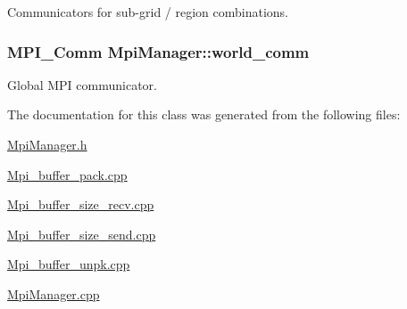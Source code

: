 Communicators for sub-\/grid / region combinations. 

\subsubsection[{\texorpdfstring{world\+\_\+comm}{world_comm}}]{\setlength{\rightskip}{0pt plus 5cm}M\+P\+I\+\_\+\+Comm Mpi\+Manager\+::world\+\_\+comm}\hypertarget{class_mpi_manager_aec1ed834d1a8fa19f87499fb0d5cd332}{}\label{class_mpi_manager_aec1ed834d1a8fa19f87499fb0d5cd332}


Global M\+PI communicator. 



The documentation for this class was generated from the following files\+:\begin{DoxyCompactItemize}
\item 
\hyperlink{_mpi_manager_8h}{Mpi\+Manager.\+h}\item 
\hyperlink{_mpi__buffer__pack_8cpp}{Mpi\+\_\+buffer\+\_\+pack.\+cpp}\item 
\hyperlink{_mpi__buffer__size__recv_8cpp}{Mpi\+\_\+buffer\+\_\+size\+\_\+recv.\+cpp}\item 
\hyperlink{_mpi__buffer__size__send_8cpp}{Mpi\+\_\+buffer\+\_\+size\+\_\+send.\+cpp}\item 
\hyperlink{_mpi__buffer__unpk_8cpp}{Mpi\+\_\+buffer\+\_\+unpk.\+cpp}\item 
\hyperlink{_mpi_manager_8cpp}{Mpi\+Manager.\+cpp}\end{DoxyCompactItemize}
